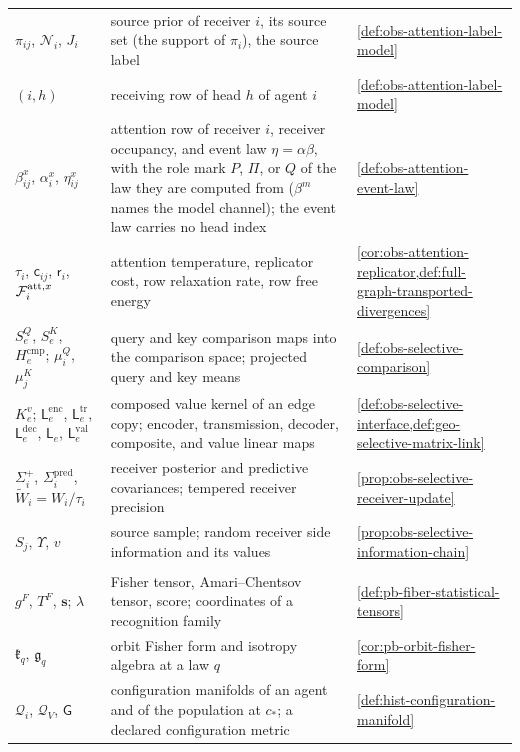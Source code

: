 {\begin{longtable}{@{}>{\raggedright\arraybackslash}p{}
>{\raggedright\arraybackslash}p{}
>{\raggedright\arraybackslash}p{}@{}}
$\pi_{ij}$, $\mathcal N_i$, $J_i$ & source prior of receiver $i$, its source set (the support of $\pi_i$), the source label & \cref{def:obs-attention-label-model} \\
$(i,h)$ & receiving row of head $h$ of agent $i$ & \cref{def:obs-attention-label-model} \\
$\beta^x_{ij}$, $\alpha^x_i$, $\eta^x_{ij}$ & attention row of receiver $i$, receiver occupancy, and event law $\eta=\alpha\beta$, with the role mark $P$, $\Pi$, or $Q$ of the law they are computed from ($\beta^m$ names the model channel); the event law carries no head index & \cref{def:obs-attention-event-law} \\
$\tau_i$, $\mathsf c_{ij}$, $\mathsf r_i$, $\mathcal F^{\mathrm{att},x}_i$ & attention temperature, replicator cost, row relaxation rate, row free energy & \cref{cor:obs-attention-replicator,def:full-graph-transported-divergences} \\
$S^Q_e$, $S^K_e$, $H^{\mathrm{cmp}}_e$; $\mu^Q_i$, $\mu^K_j$ & query and key comparison maps into the comparison space; projected query and key means & \cref{def:obs-selective-comparison} \\
$K^v_e$; $\mathsf L^{\mathrm{enc}}_e$, $\mathsf L^{\mathrm{tr}}_e$, $\mathsf L^{\mathrm{dec}}_e$, $\mathsf L_e$, $\mathsf L^{\mathrm{val}}_e$ & composed value kernel of an edge copy; encoder, transmission, decoder, composite, and value linear maps & \cref{def:obs-selective-interface,def:geo-selective-matrix-link} \\
$\Sigma^+_i$, $\Sigma^{\mathrm{pred}}_i$, $\widetilde W_i=W_i/\tau_i$ & receiver posterior and predictive covariances; tempered receiver precision & \cref{prop:obs-selective-receiver-update} \\
$S_j$, $\Upsilon$, $v$ & source sample; random receiver side information and its values & \cref{prop:obs-selective-information-chain} \\
\multicolumn{3}{@{}l}{\textbf{Fiber geometry, histories, and time scales}} \\
$g^F$, $T^F$, $\mathbf s$; $\lambda$ & Fisher tensor, Amari--Chentsov tensor, score; coordinates of a recognition family & \cref{def:pb-fiber-statistical-tensors} \\
$\mathfrak k_q$, $\mathfrak g_q$ & orbit Fisher form and isotropy algebra at a law $q$ & \cref{cor:pb-orbit-fisher-form} \\
$\mathcal Q_i$, $\mathcal Q_V$, $\mathsf G$ & configuration manifolds of an agent and of the population at $c_*$; a declared configuration metric & \cref{def:hist-configuration-manifold} \\

\end{longtable}}
